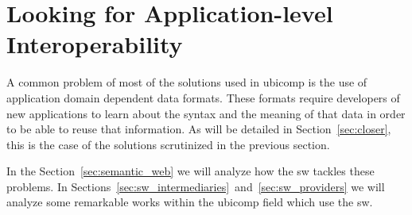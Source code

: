 \section{Looking for Application-level Interoperability}
\label{sec:interoperability}

A common problem of most of the solutions used in \ac{ubicomp} is the use of application domain dependent data formats.
These formats require developers of new applications to learn about the syntax and the meaning of that data in order to be able to reuse that information.
As will be detailed in Section~\ref{sec:closer}, this is the case of the solutions scrutinized in the previous section.

In the Section~\ref{sec:semantic_web} we will analyze how the \acl{sw} tackles these problems.
In Sections~\ref{sec:sw_intermediaries}~and~\ref{sec:sw_providers} we will analyze some remarkable works within the \ac{ubicomp} field which use the \ac{sw}.




